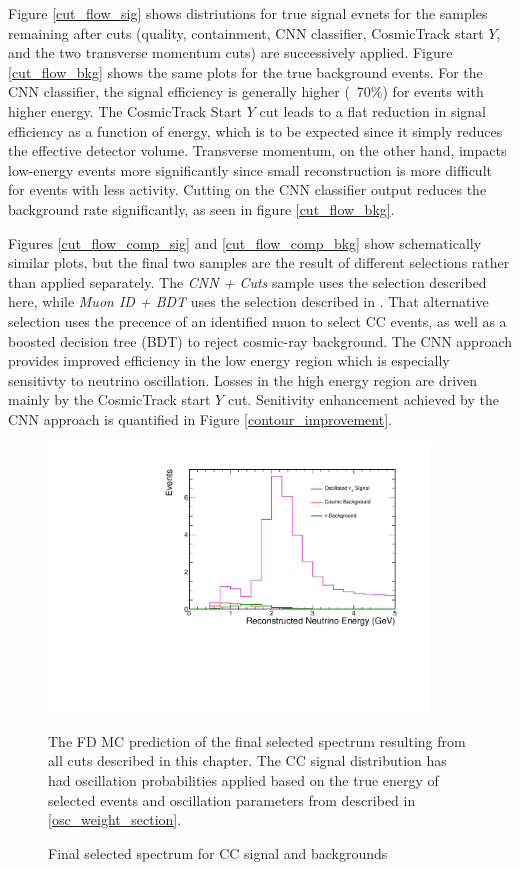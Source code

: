 Figure \ref{cut_flow_sig} shows distriutions for true signal
evnets for the samples
remaining after cuts (quality, containment, CNN classifier, CosmicTrack start
$Y$, and the two transverse momentum cuts) are successively applied.
Figure \ref{cut_flow_bkg} shows the same plots for the true background events.
For the CNN classifier, the signal efficiency is generally higher (~70\%)
for events with higher energy.
The CosmicTrack Start $Y$ cut leads to a flat reduction in signal efficiency
as a function of energy, which is to be expected since it simply reduces
the effective detector volume.
Transverse momentum, on the other hand, impacts low-energy events more
significantly since small reconstruction is more difficult for events
with less activity.
Cutting on the CNN classifier output reduces the background rate significantly,
as seen in figure \ref{cut_flow_bkg}.

Figures \ref{cut_flow_comp_sig} and \ref{cut_flow_comp_bkg} show
schematically similar plots, but the final two samples
are the result of different selections rather than applied separately.
The \textit{CNN + Cuts} sample uses the selection described here,
while \textit{Muon ID + BDT} uses the selection described in
\cite{nova2016numu}.
That alternative selection uses the precence of an identified muon
to select \numu CC events, as well as a boosted decision tree (BDT)
\cite{friedman2002stochastic} to reject cosmic-ray background.
The CNN approach provides improved efficiency in the low energy region
which is especially sensitivty to neutrino oscillation.
Losses in the high energy region are driven mainly by the CosmicTrack
start $Y$ cut.
Senitivity enhancement achieved by the CNN approach is quantified
in Figure \ref{contour_improvement}.


\begin{figure}
\begin{center}
\includegraphics[width=0.9\textwidth]{figures/selection/numuE.pdf}
\end{center}
\caption{Final selected spectrum for \numu CC signal and backgrounds }{
The FD MC prediction of the final selected spectrum resulting from all cuts
described in this chapter.
The \numu CC signal distribution has had oscillation probabilities applied
based on the true energy of selected events and oscillation parameters
from described in \ref{osc_weight_section}.
}
\label{final_selection}
\end{figure}




